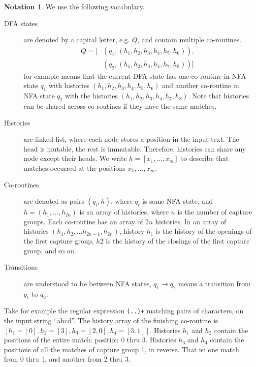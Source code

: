 \documentclass[11pt]{Thesis}
\theoremstyle{definition}
\newtheorem*{notation}{Notation}
\begin{document}
\begin{notation}

We use the following vocabulary.

\begin{description}
\item[DFA states] are denoted by a capital letter, e.g. $Q$, and
	contain multiple co-routines.
  \begin{equation*}\begin{split}Q=[&(q_1, (h_1, h_2, h_3, h_4, h_5, h_6)),\\
	&(q_2, (h_1, h_2, h_3, h_4, h_7, h_8))]\end{split}\end{equation*} for example means
	that the current DFA state has one co-routine in NFA state $q_1$ with
	histories $(h_1, h_2, h_3, h_4, h_5, h_6)$ and another co-routine in NFA state
	$q_2$ with the histories $(h_1, h_2, h_3, h_4, h_7, h_8)$.
	Note that histories can be shared across co-routines if they
	have the same matches.
\item[Histories] are linked list, where each node stores a position in the
  input text.  The head is mutable, the rest is immutable. Therefore, histories
  can share any node except their heads. We write $h=[x_1, \dots, x_m]$ to
  describe that matches occurred at the positions $x_1, \dots, x_m$. 
\item[Co-routines] are denoted as pairs $(q_i, h)$, where $q_i$ is some
	NFA state, and $h = (h_1, \dots, h_{2n})$ is an array of histories,
	where $n$ is the number of capture groups.  Each co-routine has an array
	of $2n$ histories. In an array of histories $(h_1, h_2, \dots
	h_{2n-1}, h_{2n})$, history $h_1$ is the history of the openings
	of the first capture group, $h2$ is the history of the closings of
	the first capture group, and so on.
\item[Transitions] are  understood to be between NFA states,
	$q_1\rightarrow q_2$ means a transition from $q_1$ to $q_2$.
\end{description}

Take for example the regular expression \texttt{(..)+} matching
pairs of characters, on the input string ``abcd''. The history array of the
finishing co-routine  is $[h_1=[0], h_2=[3], h_3=[2,0], h_4=[3,1]]$.
Histories $h_1$ and $h_2$ contain the positions of the entire match: position 0
thru 3.  Histories $h_3$ and $h_4$ contain the positions of all the matches of
capture group 1, in reverse. That is: one match from 0 thru 1, and another from
2 thru 3.


\end{notation}
\end{document}
